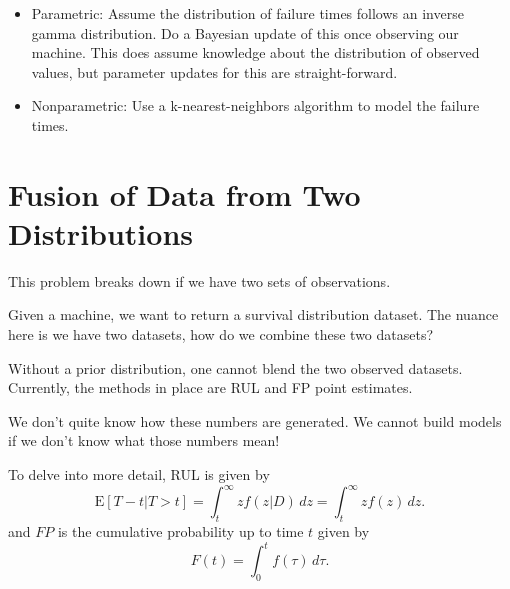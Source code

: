 \documentclass[english]{article}
\numberwithin{equation}{section}
\newcommand{\E}{\mathrm{E}}
\begin{document}
\begin{itemize}
	\item Parametric:  Assume the distribution of failure times follows an inverse gamma distribution. Do a Bayesian update of this once observing our machine. This does assume knowledge about the distribution of observed values, but parameter updates for this are straight-forward.
	\item Nonparametric: Use a k-nearest-neighbors algorithm to model the failure times.
\end{itemize}
%
%

\section*{Fusion of Data from Two Distributions}
This problem breaks down if we have two sets of observations.

Given a machine, we want to return a survival distribution dataset. The nuance here is we have two datasets, how do we combine these two datasets? 

Without a prior distribution, one cannot blend the two observed datasets. Currently, the methods in place are RUL and FP point estimates.

We don't quite know how these numbers are generated. We cannot build models if we don't know what those numbers mean!

To delve into more detail, RUL is given by $$\E[T-t|T>t]=\int_{t}^{\infty} z f(z|D)\,dz = \int_t^{\infty} z f(z)\,dz.$$ and $FP$ is the cumulative probability up to time $t$ given by $$F(t)=\int_0^t f(\tau)\,d\tau.$$
\end{document}
